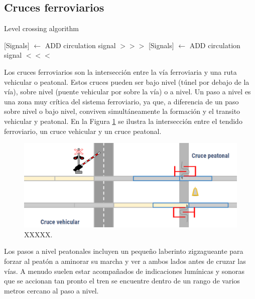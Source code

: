 \subsection{Cruces ferroviarios}

\begin{algorithm}[hbt!]
        \caption{Level crossing algorithm}\label{alg:LC}
        \DontPrintSemicolon
        \SetNoFillComment
        \LinesNotNumbered 
        {
            [Signals] $\gets$ ADD circulation signal $>>>$\;
            [Signals] $\gets$ ADD circulation signal $<<<$\;
        }
        \KwResult{[Signals]} 
    \end{algorithm}
    
Los cruces ferroviarios son la intersección entre la vía ferroviaria y una ruta vehicular o peatonal. Estos cruces pueden ser bajo nivel (túnel por debajo de la vía), sobre nivel (puente vehicular por sobre la vía) o a nivel. Un paso a nivel es una zona muy crítica del sistema ferroviario, ya que, a diferencia de un paso sobre nivel o bajo nivel, conviven simultáneamente la formación y el transito vehicular y peatonal. En la Figura \ref{fig:cruce_1} se ilustra la intersección entre el tendido ferroviario, un cruce vehicular y un cruce peatonal.

    \begin{figure}[!h]
        \centering
        \includegraphics[width=1\textwidth]{Figuras/cruce}
        \centering\caption{XXXXX.}
        \label{fig:cruce_1}
    \end{figure}
    
Los pasos a nivel peatonales incluyen un pequeño laberinto zigzagueante para forzar al peatón a aminorar su marcha y ver a ambos lados antes de cruzar las vías. A menudo suelen estar acompañados de indicaciones lumínicas y sonoras que se accionan tan pronto el tren se encuentre dentro de un rango de varios metros cercano al paso a nivel.

